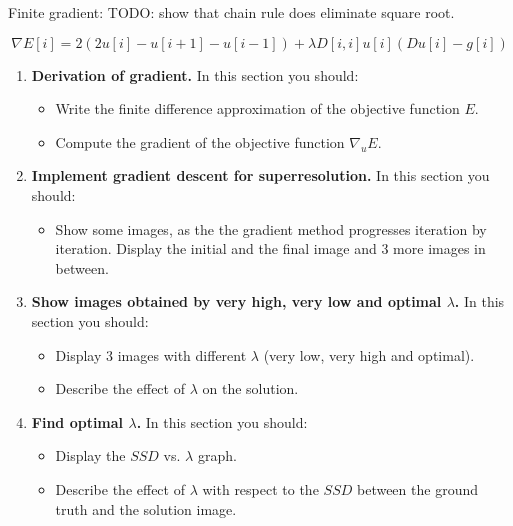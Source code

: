 \documentclass{paper}
\begin{document}
Finite gradient:
TODO: show that chain rule does eliminate square root.

\begin{equation}
\nabla E[i] = 2 (2u[i] - u[i + 1] - u[i - 1]) + \lambda D[i,i] u[i] (Du[i] - g[i])
\end{equation}
\begin{enumerate}
\item \textbf{Derivation of gradient.} In this section you should:

\begin{itemize}
\item Write the finite difference approximation of the objective function $E$.
\item Compute the gradient of the objective function $\nabla_uE$.  
\end{itemize}


\item \textbf{Implement gradient descent for superresolution.} In this section you should:

\begin{itemize}
\item Show some images, as the the gradient method progresses iteration by iteration. Display the initial and the final image and 3 more images in between.
\end{itemize}

\item \textbf{Show images obtained by very high, very low and optimal $\lambda$.} In this section you should:

\begin{itemize}
\item Display 3 images with different $\lambda$ (very low, very high and optimal).
\item Describe the effect of $\lambda$ on the solution.
\end{itemize}

\item \textbf{ Find optimal $\lambda$.} In this section you should:

\begin{itemize}
\item Display the $SSD$ vs. $\lambda$ graph.
\item Describe the effect of $\lambda$ with respect to the $SSD$ between the ground truth and the solution image.
\end{itemize}


\end{enumerate}


 
\end{document}
